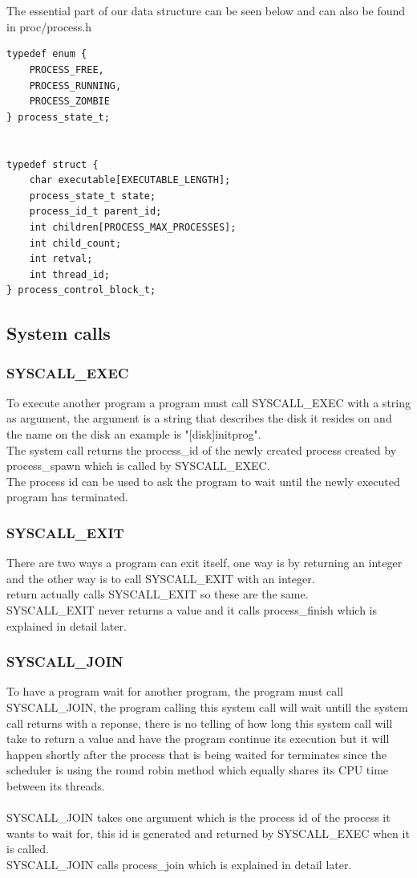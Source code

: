 \documentclass[a4paper,12pt,danish]{report}
\begin{document}
\\
\\
The essential part of our data structure can be seen below and can also be found in proc/process.h
\begin{verbatim}
typedef enum {
    PROCESS_FREE,
    PROCESS_RUNNING,
    PROCESS_ZOMBIE
} process_state_t;


typedef struct {
    char executable[EXECUTABLE_LENGTH];
    process_state_t state;
    process_id_t parent_id;
    int children[PROCESS_MAX_PROCESSES];
    int child_count;
    int retval;
    int thread_id;
} process_control_block_t;
\end{verbatim}
\subsection{System calls}
\subsubsection{SYSCALL\_EXEC}
To execute another program a program must call SYSCALL\_EXEC with a string as argument, the argument is a string that describes the disk it resides on and the name on the disk an example is "[disk]initprog".
\\
The system call returns the process\_id of the newly created process created by process\_spawn which is called by SYSCALL\_EXEC.
\\
The process id can be used to ask the program to wait until the newly executed program has terminated.
\subsubsection{SYSCALL\_EXIT}
There are two ways a program can exit itself, one way is by returning an integer and the other way is to call SYSCALL\_EXIT with an integer.
\\
return actually calls SYSCALL\_EXIT so these are the same.
\\
SYSCALL\_EXIT never returns a value and it calls process\_finish which is explained in detail later.
\subsubsection{SYSCALL\_JOIN}
To have a program wait for another program, the program must call SYSCALL\_JOIN, the program calling this system call will wait untill the system call returns with a reponse, there is no telling of how long this system call will take to return a value and have the program continue its execution but it will happen shortly after the process that is being waited for terminates since the scheduler is using the round robin method which equally shares its CPU time between its threads.
\\
\\
SYSCALL\_JOIN takes one argument which is the process id of the process it wants to wait for, this id is generated and returned by SYSCALL\_EXEC when it is called.
\\
SYSCALL\_JOIN calls process\_join which is explained in detail later. 
\newpage
\end{document}
